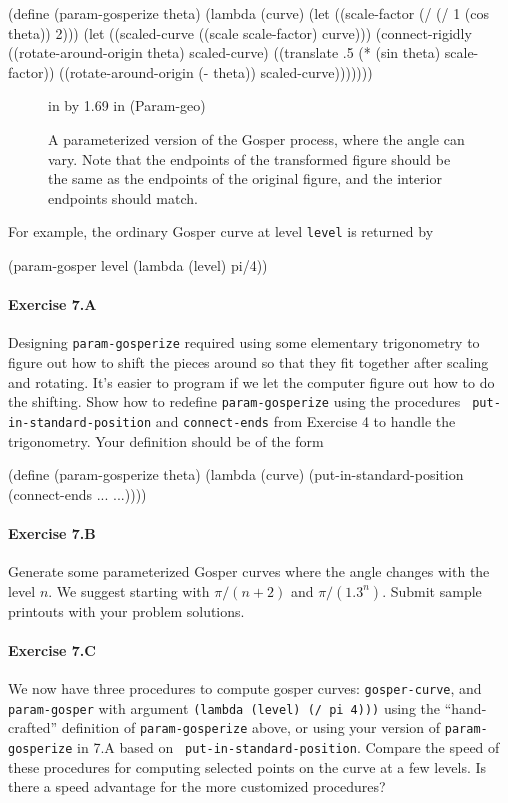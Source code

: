 \beginlisp        
(define (param-gosperize theta)
  (lambda (curve)
    (let ((scale-factor (/ (/ 1 (cos theta)) 2)))
      (let ((scaled-curve ((scale scale-factor) curve)))
        (connect-rigidly ((rotate-around-origin theta) scaled-curve)
                         ((translate .5 (* (sin theta) scale-factor))
                          ((rotate-around-origin (- theta)) scaled-curve)))))))
\endlisp

\begin{figure}
 in by 1.69 in (Param-geo)
\caption{{\protect\footnotesize
A parameterized version of the Gosper process, where the
angle can vary.  Note that the endpoints of the transformed figure
should be the same as the endpoints of the original figure, and
the interior endpoints should match.}}
\label{param-geo}
\end{figure}


For example, the ordinary Gosper curve at level {\tt level} is returned by

\beginlisp
(param-gosper level (lambda (level) pi/4))
\endlisp

\paragraph{Exercise 7.A}  Designing {\tt param-gosperize} required
using some elementary trigonometry to figure out how to shift the pieces
around so that they fit together after scaling and rotating.  It's easier
to program if we let the computer figure out how to do the shifting.  Show
how to redefine {\tt param-gosperize} using the procedures {\tt
put-in-standard-position} and {\tt connect-ends} from Exercise 4 to handle
the trigonometry.  Your definition should be of the form

\beginlisp
(define (param-gosperize theta)
  (lambda (curve)
    (put-in-standard-position
      (connect-ends
        ...
        ...))))
\endlisp


\paragraph{Exercise 7.B}
Generate some parameterized Gosper curves where the angle changes with the
level $n$.  We suggest starting with $\pi/(n+2)$ and $\pi/(1.3^n)$.
Submit sample printouts with your problem solutions.

\paragraph{Exercise 7.C}
We now have three procedures to compute gosper curves: {\tt gosper-curve},
and {\tt param-gosper} with argument {\tt (lambda (level) (/ pi 4)))}
using the ``hand-crafted'' definition of {\tt param-gosperize} above, or
using your version of {\tt param-gosperize} in 7.A based on {\tt
put-in-standard-position}.  Compare the speed of these procedures for
computing selected points on the curve at a few levels.  Is there a speed
advantage for the more customized procedures?

